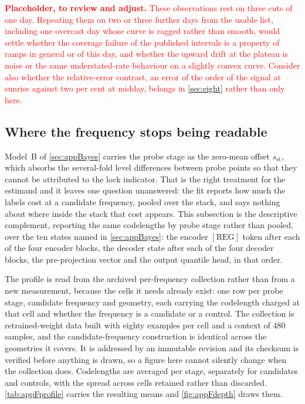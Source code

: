 \textcolor{red}{\textbf{Placeholder, to review and adjust.} These observations rest on three cuts of one day. Repeating them on two or three further days from the usable list, including one overcast day whose curve is ragged rather than smooth, would settle whether the coverage failure of the published intervals is a property of ramps in general or of this day, and whether the upward drift at the plateau is noise or the same understated-rate behaviour on a slightly convex curve. Consider also whether the relative-error contrast, an error of the order of the signal at sunrise against two per cent at midday, belongs in \autoref{sec:eight} rather than only here.}

\subsection{Where the frequency stops being readable}

Model~B of \autoref{sec:appBayes} carries the probe stage as the zero-mean offset $s_{\text{st}}$, which absorbs the several-fold level differences between probe points so that they cannot be attributed to the lock indicator. That is the right treatment for the estimand and it leaves one question unanswered: the fit reports how much the labels cost at a candidate frequency, pooled over the stack, and says nothing about where inside the stack that cost appears. This subsection is the descriptive complement, reporting the same codelengths by probe stage rather than pooled, over the ten states named in \autoref{sec:appBayes}: the encoder $[\mathrm{REG}]$ token after each of the four encoder blocks, the decoder state after each of the four decoder blocks, the pre-projection vector and the output quantile head, in that order.

The profile is read from the archived per-frequency collection rather than from a new measurement, because the cells it needs already exist: one row per probe stage, candidate frequency and geometry, each carrying the codelength charged at that cell and whether the frequency is a candidate or a control. The collection is retrained-weight data built with eighty examples per cell and a context of $480$ samples, and the candidate-frequency construction is identical across the geometries it covers. It is addressed by an immutable revision and its checksum is verified before anything is drawn, so a figure here cannot silently change when the collection does. Codelengths are averaged per stage, separately for candidates and controls, with the spread across cells retained rather than discarded. \autoref{tab:appFprofile} carries the resulting means and \autoref{fig:appFdepth} draws them.

